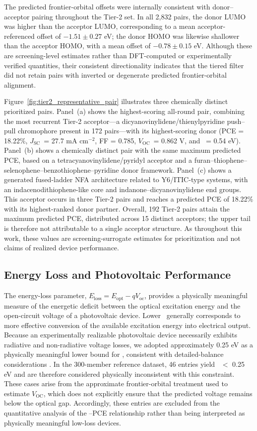 \documentclass[12pt]{article}
\newcommand{\voc}{$V_\mathrm{OC}$}
\newcommand{\jsc}{$J_\mathrm{SC}$}
\begin{document}
The predicted frontier-orbital offsets were internally consistent with donor--acceptor pairing throughout the Tier-2 set. In all 2{,}832 pairs, the donor LUMO was higher than the acceptor LUMO, corresponding to a mean acceptor-referenced offset of $-1.51 \pm 0.27$ eV; the donor HOMO was likewise shallower than the acceptor HOMO, with a mean offset of $-0.78 \pm 0.15$ eV. Although these are screening-level estimates rather than DFT-computed or experimentally verified quantities, their consistent directionality indicates that the tiered filter did not retain pairs with inverted or degenerate predicted frontier-orbital alignment.

Figure~\ref{fig:tier2_representative_pair} illustrates three chemically distinct prioritized pairs. Panel~(a) shows the highest-scoring all-round pair, combining the most recurrent Tier-2 acceptor---a dicyanovinylidene/thienylpyridine push--pull chromophore present in 172 pairs---with its highest-scoring donor (PCE = 18.22\%, \jsc\ = 27.7 mA cm$^{-2}$, FF = 0.785, \voc\ = 0.862 V, and \Eloss\ = 0.54 eV). Panel~(b) shows a chemically distinct pair with the same maximum predicted PCE, based on a tetracyanovinylidene/pyridyl acceptor and a furan--thiophene--selenophene--benzothiophene--pyridine donor framework. Panel~(c) shows a generated fused-ladder NFA architecture related to Y6/ITIC-type systems, with an indacenodithiophene-like core and indanone--dicyanovinylidene end groups. This acceptor occurs in three Tier-2 pairs and reaches a predicted PCE of 18.22\% with its highest-ranked donor partner. Overall, 192 Tier-2 pairs attain the maximum predicted PCE, distributed across 15 distinct acceptors; the upper tail is therefore not attributable to a single acceptor structure. As throughout this work, these values are screening-surrogate estimates for prioritization and not claims of realized device performance.

\subsection{Energy Loss and Photovoltaic Performance}
The energy-loss parameter, $E_{\mathrm{loss}} = E_{\mathrm{opt}} - qV_{\mathrm{oc}}$, provides a physically meaningful measure of the energetic deficit between the optical excitation energy and the open-circuit voltage of a photovoltaic device. Lower \Eloss\ generally corresponds to more effective conversion of the available excitation energy into electrical output. Because an experimentally realizable photovoltaic device necessarily exhibits radiative and non-radiative voltage losses, we adopted approximately 0.25 eV as a physically meaningful lower bound for \Eloss, consistent with detailed-balance considerations \cite{benduhn}. In the 300-member reference dataset, 46 entries yield \Eloss\ $<$ 0.25 eV and are therefore considered physically inconsistent with this constraint. These cases arise from the approximate frontier-orbital treatment used to estimate \voc, which does not explicitly ensure that the predicted voltage remains below the optical gap. Accordingly, these entries are excluded from the quantitative analysis of the \Eloss--PCE relationship rather than being interpreted as physically meaningful low-loss devices.
\end{document}
